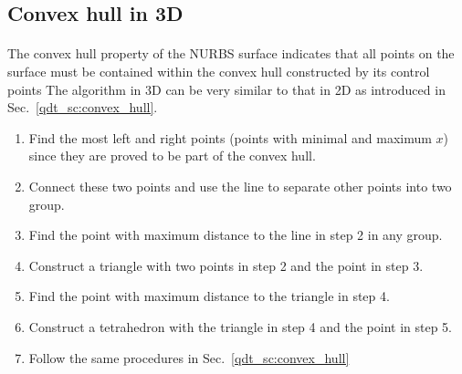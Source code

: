 \subsection{Convex hull in 3D}
\label{oct_sec:convex_hull}
\paragraph{}
The convex hull property of the NURBS surface indicates that all points on the surface must be contained within the convex hull constructed by its control points \cite{SELIMOVIC2009772}
The algorithm in 3D can be very similar to that in 2D as introduced in Sec.~\ref{qdt_sc:convex_hull}.
\begin{enumerate}
    \item Find the most left and right points (points with minimal and maximum $x$) since they are proved to be part of the convex hull.
    \item Connect these two points and use the line to separate other points into two group.
    \item Find the point with maximum distance to the line in step 2 in any group.
    \item Construct a triangle with two points in step 2 and the point in step 3.
    \item Find the point with maximum distance to the triangle in step 4. %
    \item Construct a tetrahedron with the triangle in step 4 and the point in step 5.
    \item Follow the same procedures in Sec.~\ref{qdt_sc:convex_hull}
\end{enumerate}